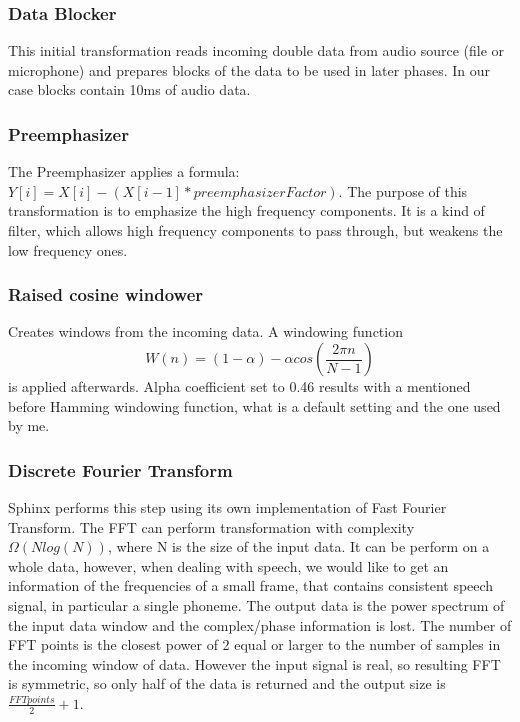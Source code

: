 \documentclass[12pt,a4paper,english]{article}
\begin{document}
\newpage

\subsubsection{Data Blocker}

This initial transformation reads incoming double data from audio source (file or microphone) and
prepares blocks of the data to be used in later phases. In our case blocks contain 10ms of audio data.

\subsubsection{Preemphasizer}

The Preemphasizer applies a formula: $Y[i]=X[i]-(X[i-1] * preemphasizerFactor)$.
The purpose of this transformation is to emphasize the high frequency components. It is a kind of filter,
which allows high frequency components to pass through, but weakens the low frequency ones.


\subsubsection{Raised cosine windower}

Creates windows from the incoming data. A windowing function
\begin{equation}
    W(n)=(1-\alpha) - \alpha cos(\frac{2 \pi n}{N - 1})
\end{equation}
 is applied afterwards. Alpha coefficient set to 0.46 results with a mentioned before Hamming windowing
 function, what is a default setting and the one used by me.

\subsubsection{Discrete Fourier Transform}

Sphinx performs this step using its own implementation of Fast Fourier Transform.
The FFT can perform transformation with complexity $\Omega(Nlog(N))$, where N is the size of the input data.
It can be perform on a whole data, however, when dealing with speech, we would like to get an information of the frequencies 
of a small frame, that contains consistent speech signal, in particular a single phoneme.
The output data is the power spectrum of the input data window and the complex/phase information is lost.
The number of FFT points is the closest power of 2 equal or larger to the number of samples in the incoming window of data. However the input signal is real, so resulting FFT is symmetric, so only half of the data is returned and the output size is $\frac{FFT points}{2} + 1$.
\end{document}
